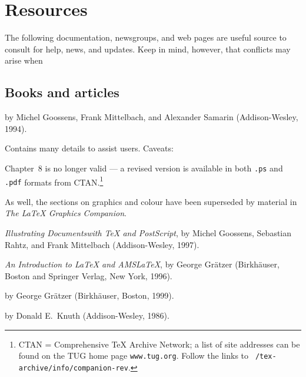 \section{Resources}

The following documentation, newsgroups, and web pages are useful
source to consult for help, news, and updates. Keep in mind, however,
that conflicts may arise when 


\subsection{Books and articles\label{documentation}}

\begin{description}  \itemsep=0pt \raggedright \frenchspacing
   \item [{\sl The \LaTeX{} Companion:}] by Michel Goossens, Frank
         Mittelbach, and Alexander Samarin (Addison-Wesley, 1994).

         Contains many details to assist users. Caveats:

         Chapter~8 is no longer valid --- a revised version is
         available in both {\tt .ps} and {\tt .pdf} formats from
         {\small CTAN}.\footnote{CTAN = Comprehensive \TeX{} Archive
         Network; a list of site addresses can be found on the {\small
         TUG} home page {\tt www.tug.org}. Follow the links to {\tt
         /tex-archive/info/companion-rev}.}

         As well, the sections on graphics and colour have been
         superseded by material in {\sl The \LaTeX{} Graphics
         Companion\/}.

   \item [{\sl The \LaTeX{} Graphics Companion:}]{\sl Illustrating
         Documents\break with \TeX{} and PostScript\/}, by Michel
         Goossens, Sebastian Rahtz, and Frank Mittelbach
         (Addison-Wesley, 1997).

   \item [{\sl Math into \LaTeX:}] {\sl An Introduction to \LaTeX{}
         and AMS\LaTeX{}}, by George Gr\"atzer (Birkh\"auser, Boston
         and Springer Verlag, New York, 1996).

   \item [{\sl First Steps in \LaTeX:}] by George Gr\"atzer
          (Birkh\"auser, Boston, 1999).

   \item [{\sl The \TeX book:}] by Donald E.~Knuth (Addison-Wesley,
         1986). 


\end{description}
